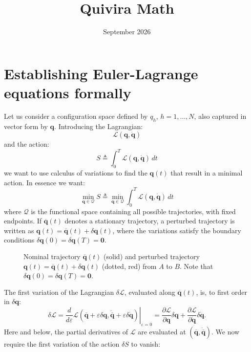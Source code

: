 \documentclass{article}
\title{Quivira Math}
\date{September 2026}
\begin{document}
\maketitle

\section{Establishing Euler-Lagrange equations formally}
Let us consider a configuration space defined by $q_h$, $h = 1,\ldots,N$, also captured in vector form by $\bm q$. Introducing the Lagrangian:
$$
\mathcal L(\bm q, \dot{\bm q})
$$
and the action:
$$
S \triangleq \int_0^T \mathcal L(\bm q, \dot{\bm q})\,dt
$$
we want to use calculus of variations to find the $\bm q(t)$ that result in a minimal action. In essence we want:
$$
\min_{\bm q\in \mathcal Q} S  \triangleq
\min_{\bm q\in \mathcal Q}\int_0^T \mathcal L(\bm q, \dot{\bm q})\,dt
$$
where $\mathcal Q$ is the functional space containing all possible trajectories, with fixed endpoints. If $\overline{\bm q}(t)$ denotes a stationary trajectory, a perturbed trajectory is written as $\bm q(t)=\overline{\bm q}(t)+\delta\bm q(t)$, where the variations satisfy the boundary conditions $\delta \bm q(0) = \delta \bm q(T) = \bm 0$.

\begin{figure}[tb]
\centering
{}
\caption{Nominal trajectory $\overline{\bm q}(t)$ (solid) and perturbed trajectory $\bm q(t)=\overline{\bm q}(t)+\delta \bm q(t)$ (dotted, red) from $A$ to $B$. Note that $\delta \bm q(0) = \delta \bm q(T) = \bm 0$.}
\label{fig:trajectory}
\end{figure}
\noindent
The first variation of the Lagrangian $\delta\mathcal L$, evaluated along $\overline{\bm q}(t)$, is, to first order in $\delta\bm q$:
$$
\delta \mathcal L =
\left.
\frac{d}{d\varepsilon}
\mathcal L\left(
\overline{\bm q} + \varepsilon\delta \bm q,
\dot{\overline{\bm q}} + \varepsilon\delta\dot{\bm q}
\right)
\right|_{\varepsilon=0}
=
\frac{\partial \mathcal L}{\partial \bm q}\delta\bm q
+
\frac{\partial \mathcal L}{\partial \dot{\bm q}}\delta\dot{\bm q}.
$$
Here and below, the partial derivatives of $\mathcal L$ are evaluated at $(\overline{\bm q},\dot{\overline{\bm q}})$.
We now require the first variation of the action $\delta S$ to vanish:
\end{document}

